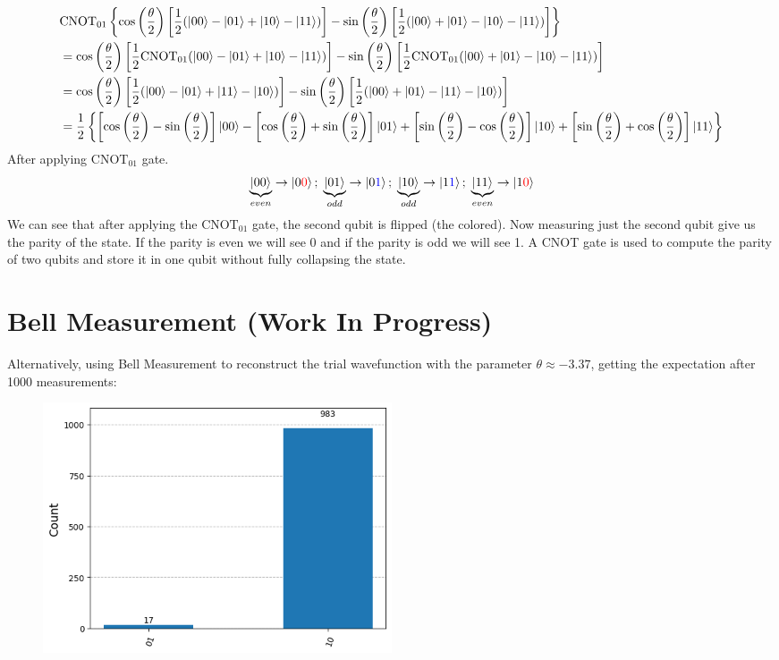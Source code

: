 \documentclass{article}
\begin{document}
\begin{align*}
	 & \text{CNOT}_{01} \left\{\cos\left(\frac{\theta}{2}\right)\left[\frac{1}{2}(|00\rangle - |01\rangle + |10\rangle - |11\rangle)\right] - \sin\left(\frac{\theta}{2}\right)\left[\frac{1}{2}(|00\rangle + |01\rangle - |10\rangle - |11\rangle)\right]\right\}                                                \\
	 & = \cos\left(\frac{\theta}{2}\right)\left[\frac{1}{2}\text{CNOT}_{01}(|00\rangle - |01\rangle + |10\rangle - |11\rangle)\right] - \sin\left(\frac{\theta}{2}\right)\left[\frac{1}{2}\text{CNOT}_{01}(|00\rangle + |01\rangle - |10\rangle - |11\rangle)\right]                                              \\
	 & = \cos\left(\frac{\theta}{2}\right)\left[\frac{1}{2}(|00\rangle - |01\rangle + |11\rangle - |10\rangle)\right] - \sin\left(\frac{\theta}{2}\right)\left[\frac{1}{2}(|00\rangle + |01\rangle - |11\rangle - |10\rangle)\right]                                                                              \\
	 & = \frac{1}{2}\left\{\left[\cos\left(\frac{\theta}{2}\right) - \sin\left(\frac{\theta}{2}\right)\right]\ket{00} - \left[\cos\left(\frac{\theta}{2}\right) + \sin\left(\frac{\theta}{2}\right)\right] \ket{01} + \left[\sin\left(\frac{\theta}{2}\right) - \cos\left(\frac{\theta}{2}\right)\right] \ket{10}
	+ \left[\sin\left(\frac{\theta}{2}\right)+ \cos\left(\frac{\theta}{2}\right) \right]\ket{11} \right\}
\end{align*}
After applying \(\text{CNOT}_{01}\) gate.
\[\underbrace{\ket{00}}_{even} \rightarrow \ket{0\textcolor{red}{0}}; \; \underbrace{\ket{01}}_{odd} \rightarrow \ket{0\textcolor{blue}{1}}; \; \underbrace{\ket{10}}_{odd} \rightarrow \ket{1 \textcolor{blue}{1}}; \; \underbrace{\ket{11}}_{even} \rightarrow \ket{1\textcolor{red}{0}}\]
We can see that after applying the \(\text{CNOT}_{01}\) gate, the second qubit is flipped (the colored). Now measuring just the second qubit give us the parity of the state. If the parity is even we will see 0 and if the parity is odd we will see 1. A CNOT gate is used to compute the parity
of two qubits and store it in one qubit without fully collapsing the state. \\
\section{Bell Measurement (Work In Progress)}
Alternatively, using Bell Measurement to reconstruct the trial wavefunction with the parameter \(\theta \approx -3.37\), getting the expectation after 1000 measurements:
\begin{figure}[H]
	\centering
	\includegraphics[width=0.5\textwidth, height=0.3\textheight]{1000.png}
\end{figure}
\end{document}
